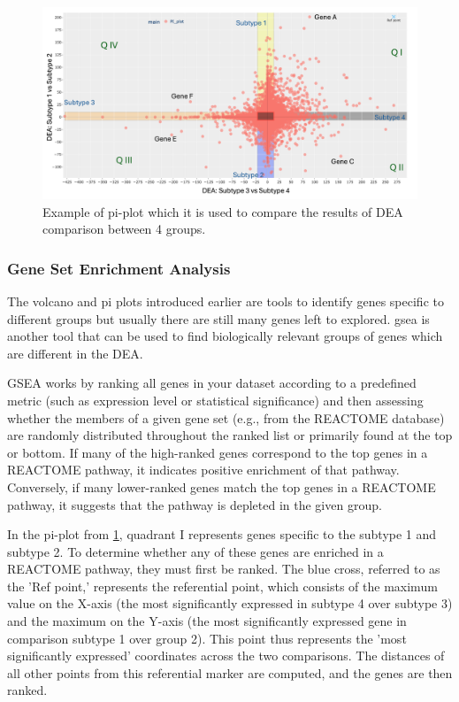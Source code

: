 \begin{figure}[!htb]    
    \centering
    \includegraphics[width=1.0\textwidth,height=1.0\textheight,keepaspectratio]{Sections/Lit_review/Resources/pi_explainer.png}
    \caption[Pi plot example]{Example of pi-plot which it is used to compare the results of DEA comparison between 4 groups.}
    \label{fig:lit:pi_eg}
\end{figure}

\subsubsection{Gene Set Enrichment Analysis} \label{s:lit:gsea}

The volcano and pi plots introduced earlier are tools to identify genes specific to different groups but usually there are still many genes left to explored. \acrfull{gsea} is another tool that can be used to find biologically relevant groups of genes which are different in the DEA. 

GSEA works by ranking all genes in your dataset according to a predefined metric (such as expression level or statistical significance) and then assessing whether the members of a given gene set (e.g., from the REACTOME database) are randomly distributed throughout the ranked list or primarily found at the top or bottom. If many of the high-ranked genes correspond to the top genes in a REACTOME pathway, it indicates positive enrichment of that pathway. Conversely, if many lower-ranked genes match the top genes in a REACTOME pathway, it suggests that the pathway is depleted in the given group.

In the pi-plot from \cref{fig:lit:pi_eg}, quadrant I represents genes specific to the subtype 1 and subtype 2. To determine whether any of these genes are enriched in a REACTOME pathway, they must first be ranked. The blue cross, referred to as the 'Ref point,' represents the referential point, which consists of the maximum value on the X-axis (the most significantly expressed in subtype 4 over subtype 3) and the maximum on the Y-axis (the most significantly expressed gene in comparison subtype 1 over group 2). This point thus represents the 'most significantly expressed' coordinates across the two comparisons. The distances of all other points from this referential marker are computed, and the genes are then ranked. 


